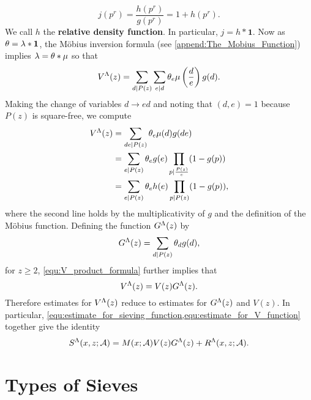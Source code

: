 \documentclass[12pt,oneside]{book}
\begin{document}
    \[
      j(p^{r}) = \frac{h(p^{r})}{g(p^{r})} = 1+h(p^{r}).
    \]
    We call $h$ the \textbf{relative density function}. In particular, $j = h \ast \mathbf{1}$. Now as $\theta = \lambda \ast \mathbf{1}$, the M\"obius inversion formula (see \cref{append:The_Mobius_Function}) implies $\lambda = \theta \ast \mu$ so that
    \[
      V^{\Lambda}(z) = \sum_{d \mid P(z)}\sum_{e \mid d}\theta_{e}\mu\left(\frac{d}{e}\right)g(d).
    \]
    Making the change of variables $d \to ed$ and noting that $(d,e) = 1$ because $P(z)$ is square-free, we compute
    \begin{align*}
      V^{\Lambda}(z) &= \sum_{de \mid P(z)}\theta_{e}\mu(d)g(de) \\
      &= \sum_{e \mid P(z)}\theta_{e}g(e)\prod_{p \mid \frac{P(z)}{e}}(1-g(p)) \\
      &= \sum_{e \mid P(z)}\theta_{e}h(e)\prod_{p \mid P(z)}(1-g(p)),
    \end{align*}
    where the second line holds by the multiplicativity of $g$ and the definition of the M\"obius function. Defining the function $G^{\Lambda}(z)$ by
    \[
      G^{\Lambda}(z) = \sum_{d \mid P(z)}\theta_{d}g(d),
    \]
    for $z \ge 2$, \cref{equ:V_product_formula} further implies that
    \begin{equation}\label{equ:estimate_for_V_function}
      V^{\Lambda}(z) = V(z)G^{\Lambda}(z).
    \end{equation}
    Therefore estimates for $V^{\Lambda}(z)$ reduce to estimates for $G^{\Lambda}(z)$ and $V(z)$. In particular, \cref{equ:estimate_for_sieving_function,equ:estimate_for_V_function} together give the identity
    \[
      S^{\Lambda}(x,z;\mathcal{A}) = M(x;\mathcal{A})V(z)G^{\Lambda}(z)+R^{\Lambda}(x,z;\mathcal{A}).
    \]

\chapter{Types of Sieves}
\end{document}
